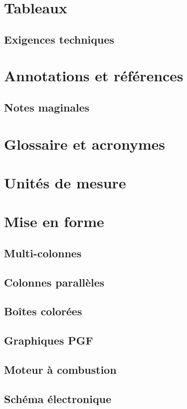 \section{Tableaux}


\subsection{Exigences techniques}

\section{Annotations et références}

\subsection{Notes maginales}

\section{Glossaire et acronymes}

\section{Unités de mesure}

\section{Mise en forme}

\subsection{Multi-colonnes}


\subsection{Colonnes parallèles}

\subsection{Boîtes colorées}

\subsection{Graphiques PGF}


\subsection{Moteur à combustion}


\subsection{Schéma électronique}
